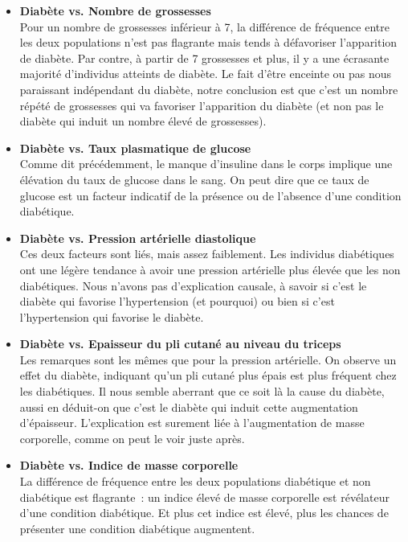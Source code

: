 \documentclass[a4paper,10pt]{report}
\begin{document}
\begin{itemize}
	\item \textbf{Diabète vs. Nombre de grossesses}
	\\ Pour un nombre de grossesses inférieur à 7, la différence de fréquence entre les deux populations n'est pas flagrante mais tends à défavoriser l'apparition de diabète. Par contre, à partir de 7 grossesses et plus, il y a une écrasante majorité d'individus atteints de diabète. Le fait d'être enceinte ou pas nous paraissant indépendant du diabète, notre conclusion est que c'est un nombre répété de grossesses qui va favoriser l'apparition du diabète (et non pas le diabète qui induit un nombre élevé de grossesses).
		
	\item \textbf{Diabète vs. Taux plasmatique de glucose}
	\\ Comme dit précédemment, le manque d'insuline dans le corps implique une élévation du taux de glucose dans le sang. On peut dire que ce taux de glucose est un facteur indicatif de la présence ou de l'absence d'une condition diabétique.
		
	\item \textbf{Diabète vs. Pression artérielle diastolique}
	\\ Ces deux facteurs sont liés, mais assez faiblement. Les individus diabétiques ont une légère tendance à avoir une pression artérielle plus élevée que les non diabétiques. Nous n'avons pas d'explication causale, à savoir si c'est le diabète qui favorise l'hypertension (et pourquoi) ou bien si c'est l'hypertension qui favorise le diabète.
		
	\item \textbf{Diabète vs. Epaisseur du pli cutané au niveau du triceps}
	\\ Les remarques sont les mêmes que pour la pression artérielle. On observe un effet du diabète, indiquant qu'un pli cutané plus épais est plus fréquent chez les diabétiques. Il nous semble aberrant que ce soit là la cause du diabète, aussi en déduit-on que c'est le diabète qui induit cette augmentation d'épaisseur. L'explication est surement liée à l'augmentation de masse corporelle, comme on peut le voir juste après.
		
	\item \textbf{Diabète vs. Indice de masse corporelle}
	\\ La différence de fréquence entre les deux populations diabétique et non diabétique est flagrante~: un indice élevé de masse corporelle est révélateur d'une condition diabétique. Et plus cet indice est élevé, plus les chances de présenter une condition diabétique augmentent.
		

\end{itemize}
\end{document}
